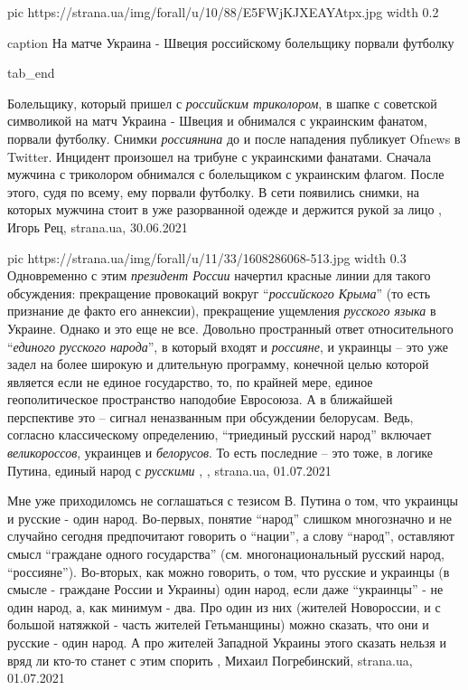      pic https://strana.ua/img/forall/u/10/88/E5FWjKJXEAYAtpx.jpg
     width 0.2

     caption На матче Украина - Швеция российскому болельщику порвали футболку

  tab_end
\fi

Болельщику, который пришел с \emph{российским триколором}, в шапке с советской
символикой на матч Украина - Швеция и обнимался с украинским фанатом, порвали
футболку.  Снимки \emph{россиянина} до и после нападения публикует Ofnews в
Twitter.  Инцидент произошел на трибуне с украинскими фанатами. Сначала мужчина
с триколором обнимался с болельщиком с украинским флагом. После этого, судя по
всему, ему порвали футболку. В сети появились снимки, на которых мужчина стоит
в уже разорванной одежде и держится рукой за лицо
, 
Игорь Рец, strana.ua, 30.06.2021

\ifcmt
  pic https://strana.ua/img/forall/u/11/33/1608286068-513.jpg
  width 0.3
\fi
Одновременно с этим \emph{президент России} начертил красные линии для такого
обсуждения: прекращение провокаций вокруг \enquote{\emph{российского Крыма}} (то есть
признание де факто его аннексии), прекращение ущемления \emph{русского языка} в
Украине.  Однако и это еще не все. Довольно пространный ответ относительного
\enquote{\emph{единого русского народа}}, в который входят и \emph{россияне}, и украинцы – это уже
задел на более широкую и длительную программу, конечной целью которой является
если не единое государство, то, по крайней мере, единое геополитическое
пространство наподобие Евросоюза. А в ближайшей перспективе это – сигнал
неназванным при обсуждении белорусам. Ведь, согласно классическому определению,
\enquote{триединый русский народ} включает \emph{великороссов}, украинцев и \emph{белорусов}. То есть
последние – это тоже, в логике Путина, единый народ с \emph{русскими}
, 
, strana.ua, 01.07.2021

Мне уже приходиломсь не соглашаться с тезисом В. Путина о том, что украинцы и
русские - один народ. Во-первых, понятие \enquote{народ} слишком многозначно и не
случайно сегодня предпочитают говорить о \enquote{нации}, а слову \enquote{народ}, оставляют
смысл \enquote{граждане одного государства} (см. многонациональный русский народ,
\enquote{россияне}). Во-вторых, как можно говорить, о том, что русские и украинцы (в
смысле - граждане России и Украины) один народ, если даже \enquote{украинцы} - не один
народ, а, как минимум - два. Про один из них (жителей Новороссии, и с большой
натяжкой - часть жителей Гетьманщины) можно сказать, что они и русские - один
народ. А про жителей Западной Украины этого сказать нельзя и вряд ли кто-то
станет с этим спорить
, 
Михаил Погребинский, strana.ua, 01.07.2021

